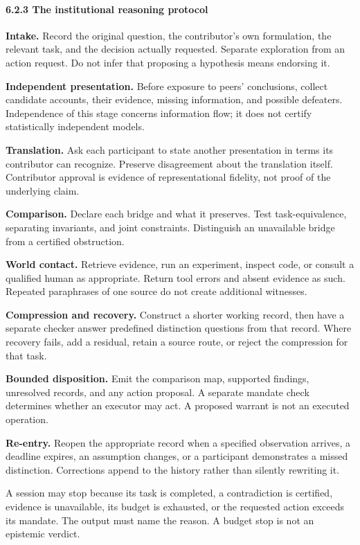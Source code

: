 \documentclass[
  10pt,
]{article}
\begin{document}
\paragraph{6.2.3 The institutional reasoning protocol}\label{the-institutional-reasoning-protocol}

\textbf{Intake.} Record the original question, the contributor's own formulation, the relevant task, and the decision actually requested. Separate exploration from an action request. Do not infer that proposing a hypothesis means endorsing it.

\textbf{Independent presentation.} Before exposure to peers' conclusions, collect candidate accounts, their evidence, missing information, and possible defeaters. Independence of this stage concerns information flow; it does not certify statistically independent models.

\textbf{Translation.} Ask each participant to state another presentation in terms its contributor can recognize. Preserve disagreement about the translation itself. Contributor approval is evidence of representational fidelity, not proof of the underlying claim.

\textbf{Comparison.} Declare each bridge and what it preserves. Test task-equivalence, separating invariants, and joint constraints. Distinguish an unavailable bridge from a certified obstruction.

\textbf{World contact.} Retrieve evidence, run an experiment, inspect code, or consult a qualified human as appropriate. Return tool errors and absent evidence as such. Repeated paraphrases of one source do not create additional witnesses.

\textbf{Compression and recovery.} Construct a shorter working record, then have a separate checker answer predefined distinction questions from that record. Where recovery fails, add a residual, retain a source route, or reject the compression for that task.

\textbf{Bounded disposition.} Emit the comparison map, supported findings, unresolved records, and any action proposal. A separate mandate check determines whether an executor may act. A proposed warrant is not an executed operation.

\textbf{Re-entry.} Reopen the appropriate record when a specified observation arrives, a deadline expires, an assumption changes, or a participant demonstrates a missed distinction. Corrections append to the history rather than silently rewriting it.

A session may stop because its task is completed, a contradiction is certified, evidence is unavailable, its budget is exhausted, or the requested action exceeds its mandate. The output must name the reason. A budget stop is not an epistemic verdict.
\end{document}
